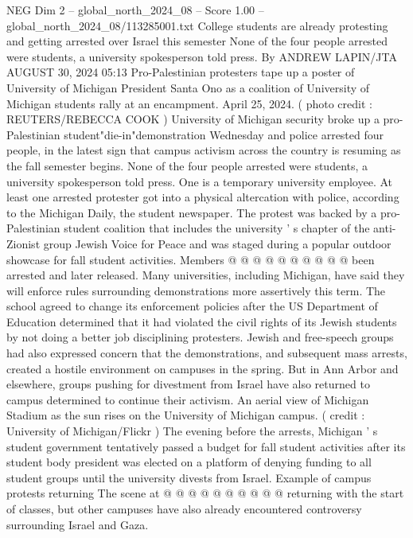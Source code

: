 \begin{textsample}{NEG Dim 2 – global\_north\_2024\_08 – Score 1.00 – global\_north\_2024\_08/113285001.txt}  \label{ex:f2_neg_053}
College students are already protesting and getting arrested over Israel this semester None of the four people arrested were students, a university spokesperson told press.
By ANDREW LAPIN/JTA AUGUST 30, 2024 05:13 Pro-Palestinian protesters tape up a poster of University of Michigan President Santa Ono as a coalition of University of Michigan students rally at an encampment.
April 25, 2024. ( photo credit : REUTERS/REBECCA COOK ) University of Michigan security broke up a pro-Palestinian student"die-in"demonstration Wednesday and police arrested four people, in the latest sign that campus activism across the country is resuming as the fall semester begins.
None of the four people arrested were students, a university spokesperson told press.
One is a temporary university employee.
At least one arrested protester got into a physical altercation with police, according to the Michigan Daily, the student newspaper.
The protest was backed by a pro-Palestinian student coalition that includes the university ' s chapter of the anti-Zionist group Jewish Voice for Peace and was staged during a popular outdoor showcase for fall student activities.
Members @ @ @ @ @ @ @ @ @ @ been arrested and later released.
Many universities, including Michigan, have said they will enforce rules surrounding demonstrations more assertively this term.
The school agreed to change its enforcement policies after the US Department of Education determined that it had violated the civil rights of its Jewish students by not doing a better job disciplining protesters.
Jewish and free-speech groups had also expressed concern that the demonstrations, and subsequent mass arrests, created a hostile environment on campuses in the spring.
But in Ann Arbor and elsewhere, groups pushing for divestment from Israel have also returned to campus determined to continue their activism.
An aerial view of Michigan Stadium as the sun rises on the University of Michigan campus. ( credit : University of Michigan/Flickr ) The evening before the arrests, Michigan ' s student government tentatively passed a budget for fall student activities after its student body president was elected on a platform of denying funding to all student groups until the university divests from Israel.
Example of campus protests returning The scene at @ @ @ @ @ @ @ @ @ @ returning with the start of classes, but other campuses have also already encountered controversy surrounding Israel and Gaza.

\end{textsample}
